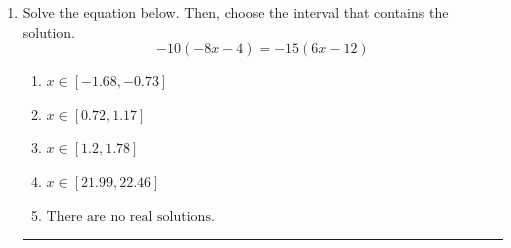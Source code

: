 \documentclass[14pt]{extbook}
\newcommand{\litem}[1]{\item#1\hspace*{-1cm}\rule{\textwidth}{0.4pt}}
\begin{document}
\begin{enumerate}
{\begin{enumerate}[label=\Alph*.]
\end{enumerate} }
\litem{
Solve the equation below. Then, choose the interval that contains the solution.\[ -10(-8x -4) = -15(6x -12) \]\begin{enumerate}[label=\Alph*.]
\item \( x \in [-1.68, -0.73] \)
\item \( x \in [0.72, 1.17] \)
\item \( x \in [1.2, 1.78] \)
\item \( x \in [21.99, 22.46] \)
\item \( \text{There are no real solutions.} \)

\end{enumerate} }
\end{enumerate}
\end{document}
